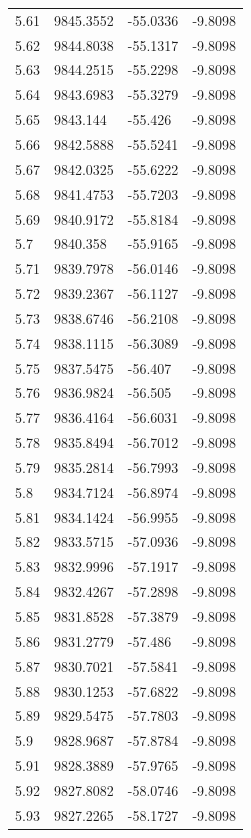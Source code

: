 \begin{table}[H]
\begin{tabular}{llll}
5.61 & 9845.3552 & -55.0336 & -9.8098 \\
5.62 & 9844.8038 & -55.1317 & -9.8098 \\
5.63 & 9844.2515 & -55.2298 & -9.8098 \\
5.64 & 9843.6983 & -55.3279 & -9.8098 \\
5.65 & 9843.144 & -55.426 & -9.8098 \\
5.66 & 9842.5888 & -55.5241 & -9.8098 \\
5.67 & 9842.0325 & -55.6222 & -9.8098 \\
5.68 & 9841.4753 & -55.7203 & -9.8098 \\
5.69 & 9840.9172 & -55.8184 & -9.8098 \\
5.7 & 9840.358 & -55.9165 & -9.8098 \\
5.71 & 9839.7978 & -56.0146 & -9.8098 \\
5.72 & 9839.2367 & -56.1127 & -9.8098 \\
5.73 & 9838.6746 & -56.2108 & -9.8098 \\
5.74 & 9838.1115 & -56.3089 & -9.8098 \\
5.75 & 9837.5475 & -56.407 & -9.8098 \\
5.76 & 9836.9824 & -56.505 & -9.8098 \\
5.77 & 9836.4164 & -56.6031 & -9.8098 \\
5.78 & 9835.8494 & -56.7012 & -9.8098 \\
5.79 & 9835.2814 & -56.7993 & -9.8098 \\
5.8 & 9834.7124 & -56.8974 & -9.8098 \\
5.81 & 9834.1424 & -56.9955 & -9.8098 \\
5.82 & 9833.5715 & -57.0936 & -9.8098 \\
5.83 & 9832.9996 & -57.1917 & -9.8098 \\
5.84 & 9832.4267 & -57.2898 & -9.8098 \\
5.85 & 9831.8528 & -57.3879 & -9.8098 \\
5.86 & 9831.2779 & -57.486 & -9.8098 \\
5.87 & 9830.7021 & -57.5841 & -9.8098 \\
5.88 & 9830.1253 & -57.6822 & -9.8098 \\
5.89 & 9829.5475 & -57.7803 & -9.8098 \\
5.9 & 9828.9687 & -57.8784 & -9.8098 \\
5.91 & 9828.3889 & -57.9765 & -9.8098 \\
5.92 & 9827.8082 & -58.0746 & -9.8098 \\
5.93 & 9827.2265 & -58.1727 & -9.8098 \\

\end{tabular}
\end{table}
